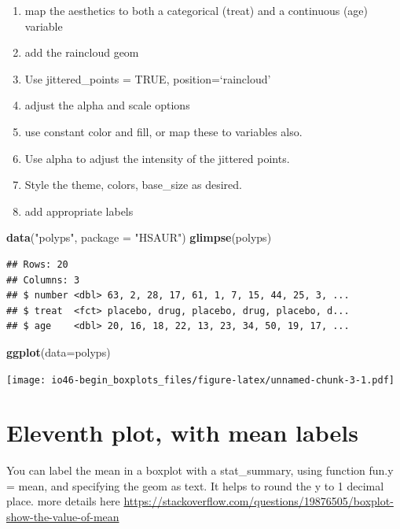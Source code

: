 \documentclass[
]{book}
\newenvironment{Shaded}{\begin{snugshade}}{\end{snugshade}}
\newcommand{\DataTypeTok}[1]{\textcolor[rgb]{0.13,0.29,0.53}{#1}}
\newcommand{\KeywordTok}[1]{\textcolor[rgb]{0.13,0.29,0.53}{\textbf{#1}}}
\newcommand{\NormalTok}[1]{#1}
\newcommand{\StringTok}[1]{\textcolor[rgb]{0.31,0.60,0.02}{#1}}
\providecommand{\tightlist}{%
  \setlength{\itemsep}{0pt}\setlength{\parskip}{0pt}}
\begin{document}
\begin{enumerate}
\def\labelenumi{\arabic{enumi}.}
\tightlist
\item
  map the aesthetics to both a categorical (treat) and a continuous (age) variable
\item
  add the raincloud geom
\item
  Use jittered\_points = TRUE, position=`raincloud'
\item
  adjust the alpha and scale options
\item
  use constant color and fill, or map these to variables also.
\item
  Use alpha to adjust the intensity of the jittered points.
\item
  Style the theme, colors, base\_size as desired.
\item
  add appropriate labels
\end{enumerate}

\begin{Shaded}
\begin{Highlighting}[]
\KeywordTok{data}\NormalTok{(}\StringTok{"polyps"}\NormalTok{, }\DataTypeTok{package =} \StringTok{"HSAUR"}\NormalTok{)}
\KeywordTok{glimpse}\NormalTok{(polyps)}
\end{Highlighting}
\end{Shaded}

\begin{verbatim}
## Rows: 20
## Columns: 3
## $ number <dbl> 63, 2, 28, 17, 61, 1, 7, 15, 44, 25, 3, ...
## $ treat  <fct> placebo, drug, placebo, drug, placebo, d...
## $ age    <dbl> 20, 16, 18, 22, 13, 23, 34, 50, 19, 17, ...
\end{verbatim}

\begin{Shaded}
\begin{Highlighting}[]
\KeywordTok{ggplot}\NormalTok{(}\DataTypeTok{data=}\NormalTok{polyps)}
\end{Highlighting}
\end{Shaded}

\texttt{[image: io46-begin\_boxplots\_files/figure-latex/unnamed-chunk-3-1.pdf]}

\hypertarget{eleventh-plot-with-mean-labels}{%
\section{Eleventh plot, with mean labels}\label{eleventh-plot-with-mean-labels}}

You can label the mean in a boxplot with a stat\_summary, using function fun.y = mean, and specifying the geom as text. It helps to round the y to 1 decimal place.
more details here \url{https://stackoverflow.com/questions/19876505/boxplot-show-the-value-of-mean}
\end{document}
